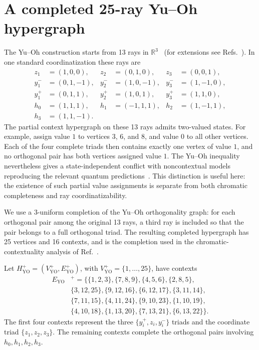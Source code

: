 \documentclass[aps,pra,twocolumn,superscriptaddress,10pt]{revtex4-2}
\newcommand{\R}{\mathbb{R}}
\newcommand{\YO}{\mathrm{YO}}
\begin{document}
\section{A completed 25-ray Yu--Oh hypergraph}\label{sec:yuo}

The Yu--Oh construction starts from 13 rays in $\R^3$~\cite{Yu-2012} (for extensions see Refs.~\cite{harding2025remarksIJTP,Cabello2025,svozil-2025-MYOCHS}).  In
one standard coordinatization these rays are
\begin{align*}
 z_1&=(1,0,0),& z_2&=(0,1,0),& z_3&=(0,0,1),\\
 y_1^-&=(0,1,-1),& y_2^-&=(1,0,-1),& y_3^-&=(1,-1,0),\\
 y_1^+&=(0,1,1),& y_2^+&=(1,0,1),& y_3^+&=(1,1,0),\\
 h_0&=(1,1,1),& h_1&=(-1,1,1),& h_2&=(1,-1,1), \\
 h_3&=(1,1,-1).
\end{align*}
The partial context hypergraph on these 13 rays admits two-valued states.  For
example, assign value $1$ to vertices $3$, $6$, and $8$, and value $0$ to all
other vertices.  Each of the four complete triads then contains exactly one
vertex of value $1$, and no orthogonal pair has both vertices assigned value
$1$.  The Yu--Oh inequality nevertheless gives a state-independent conflict
with noncontextual models reproducing the relevant quantum predictions~\cite{Yu-2012}.
This distinction is useful here: the existence of such partial value
assignments is separate from both chromatic completeness and ray
coordinatizability.

We use a 3-uniform completion of the Yu--Oh orthogonality graph: for each
orthogonal pair among the original 13 rays, a third ray is included so that
the pair belongs to a full orthogonal triad.  The resulting completed
hypergraph has 25 vertices and 16 contexts, and is the completion used in the
chromatic-contextuality analysis of Ref.~\cite{svozil-2025-color}.

Let $H_{\YO}^{+}=(V_{\YO}^{+},E_{\YO}^{+})$, with
$V_{\YO}^{+}=\{1,\ldots,25\}$, have contexts
\begin{equation}\label{eq:yuo-blocks}
\begin{aligned}
E_{\YO}&^{+}=\{
\{1,2,3\},
\{7,8,9\},
\{4,5,6\},
\{2,8,5\},\\
&\{3,12,25\},
\{9,12,16\},
\{6,12,17\},
\{3,11,14\},\\
&\{7,11,15\},
\{4,11,24\},
\{9,10,23\},
\{1,10,19\},\\
&\{4,10,18\},
\{1,13,20\},
\{7,13,21\},
\{6,13,22\}
\}.
\end{aligned}
\end{equation}
The first four contexts represent the three $\{y_i^+,z_i,y_i^-\}$ triads
and the coordinate triad $\{z_1,z_2,z_3\}$.  The remaining contexts complete
the orthogonal pairs involving $h_0,h_1,h_2,h_3$.
\end{document}
